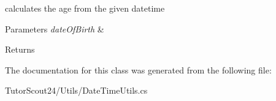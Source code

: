 calculates the age from the given datetime 


\begin{DoxyParams}{Parameters}
{\em date\+Of\+Birth} & \\
\hline
\end{DoxyParams}
\begin{DoxyReturn}{Returns}

\end{DoxyReturn}


The documentation for this class was generated from the following file\+:\begin{DoxyCompactItemize}
\item 
Tutor\+Scout24/\+Utils/Date\+Time\+Utils.\+cs\end{DoxyCompactItemize}

